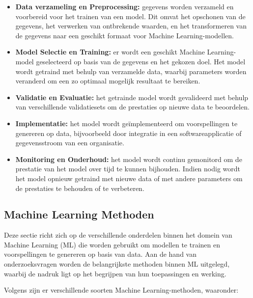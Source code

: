 \begin{itemize}
    \item \textbf{Data verzameling en Preprocessing:} gegevens worden verzameld en voorbereid voor het trainen van een model. Dit omvat het opschonen van de gegevens, het verwerken van ontbrekende waarden, en het transformeren van de gegevens naar een geschikt formaat voor Machine Learning-modellen.

    \item \textbf{Model Selectie en Training:} er wordt een geschikt Machine Learning-model geselecteerd op basis van de gegevens en het gekozen doel. Het model wordt getraind met behulp van verzamelde data, waarbij parameters worden veranderd om een zo optimaal mogelijk resultaat te bereiken.
    
    \item \textbf{Validatie en Evaluatie:} het getrainde model wordt gevalideerd met behulp van verschillende validatiesets om de prestaties op nieuwe data te beoordelen.
    
    \item \textbf{Implementatie:} het model wordt geïmplementeerd om voorspellingen te genereren op data, bijvoorbeeld door integratie in een softwareapplicatie of gegevensstroom van een organisatie.

    \item \textbf{Monitoring en Onderhoud:} het model wordt continu gemonitord om de prestatie van het model over tijd te kunnen bijhouden. Indien nodig wordt het model opnieuw getraind met nieuwe data of met andere parameters om de prestaties te behouden of te verbeteren.
\end{itemize}

\subsection{Machine Learning Methoden}

Deze sectie richt zich op de verschillende onderdelen binnen het domein van Machine Learning (ML) die worden gebruikt om modellen te trainen en voorspellingen te genereren op basis van data. Aan de hand van onderzoeksvragen worden de belangrijkste methoden binnen ML uitgelegd, waarbij de nadruk ligt op het begrijpen van hun toepassingen en werking.

Volgens \textcite{Mahesh2019} zijn er verschillende soorten Machine Learning-methoden, waaronder:

